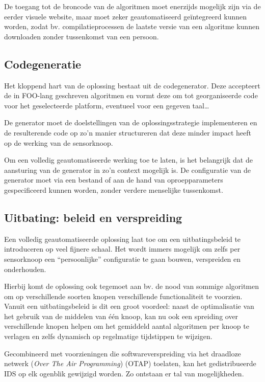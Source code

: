 De toegang tot de broncode van de algoritmen moet enerzijds mogelijk zijn via
de eerder visuele website, maar moet zeker geautomatiseerd ge\"integreerd
kunnen worden, zodat bv. compilatieprocessen de laatste versie van een
algoritme kunnen downloaden zonder tussenkomst van een persoon.

\subsection{Codegeneratie}
\label{subsection:arch-codegen}

Het kloppend hart van de oplossing bestaat uit de codegenerator. Deze
accepteert de in FOO-lang geschreven algoritmen en vormt deze om tot
georganiseerde code voor het geselecteerde platform, eventueel voor een gegeven
taal\dots

De generator moet de doelstellingen van de oplossingsstrategie implementeren en
de resulterende code op zo'n manier structureren dat deze minder impact heeft
op de werking van de sensorknoop.

Om een volledig geautomatiseerde werking toe te laten, is het belangrijk dat de
aansturing van de generator in zo'n context mogelijk is. De configuratie van de
generator moet via een bestand of aan de hand van oproepparameters
gespecificeerd kunnen worden, zonder verdere menselijke tussenkomst.

\subsection{Uitbating: beleid en verspreiding}
\label{subsection:arch-policy}

Een volledig geautomatiseerde oplossing laat toe om een uitbatingsbeleid te
introduceren op veel fijnere schaal. Het wordt immers mogelijk om zelfs per
sensorknoop een ``persoonlijke'' configuratie te gaan bouwen, verspreiden en
onderhouden.

Hierbij komt de oplossing ook tegemoet aan bv. de nood van sommige algoritmen
om op verschillende soorten knopen verschillende functionaliteit te voorzien.
Vanuit een uitbatingsbeleid is dit een groot voordeel: naast de optimalisatie
van het gebruik van de middelen van \'e\'en knoop, kan nu ook een spreiding
over verschillende knopen helpen om het gemiddeld aantal algoritmen per knoop
te verlagen en zelfs dynamisch op regelmatige tijdstippen te wijzigen.

Gecombineerd met voorzieningen die softwareverspreiding via het draadloze
netwerk (\emph{Over The Air Programming}) (OTAP) toelaten, kan het
gedistribueerde IDS op elk ogenblik gewijzigd worden. Zo ontstaan er tal van
mogelijkheden.

